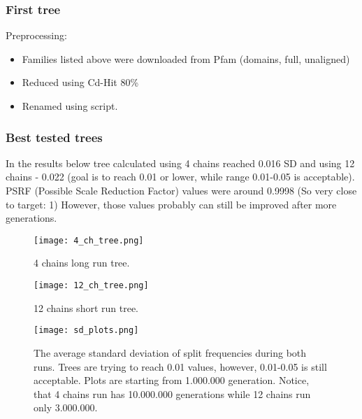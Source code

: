     \subsubsection{First tree}
    Preprocessing:
    \begin{itemize}
        \item Families listed above were downloaded from Pfam (domains, full, unaligned)
        \item Reduced using Cd-Hit 80\%
        \item Renamed using script.
    \end{itemize}


    \subsubsection{Best tested trees}
In the results below tree calculated using 4 chains reached 0.016 SD and using 12 chains - 0.022 (goal is to reach 0.01 or lower, while range 0.01-0.05 is acceptable).
PSRF (Possible Scale Reduction Factor) values were around 0.9998 (So very close to target: 1)
However, those values probably can still be improved after more generations.

\begin{figure}[H]
\begin{center}
\texttt{[image: 4\_ch\_tree.png]}
\caption{4 chains long run tree.}
\end{center}
\end{figure}

\begin{figure}[H]
\begin{center}
\texttt{[image: 12\_ch\_tree.png]}
\caption{12 chains short run tree.}
\end{center}
\end{figure}

\begin{figure}[H]
\texttt{[image: sd\_plots.png]}
\caption{The average standard deviation of split frequencies during both runs. Trees are trying to reach 0.01 values, however, 0.01-0.05 is still acceptable. Plots are starting from 1.000.000 generation. Notice, that 4 chains run has 10.000.000 generations while 12 chains run only 3.000.000.}
\end{figure}
